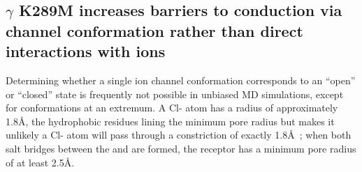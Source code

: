 \documentclass[9pt,twocolumn,twoside,lineno]{pnas-new}
\begin{document}
 
 
\subsection*{$\gamma$ K289M increases barriers to conduction via channel conformation rather than direct interactions with ions}  
 
Determining whether a single ion channel conformation corresponds to an ``open'' or ``closed'' state is frequently not possible in unbiased MD simulations, except for conformations at an extremum. A Cl- atom has a radius of approximately 1.8\AA, the hydrophobic residues lining the minimum pore radius but makes it unlikely a Cl- atom will pass through a constriction of exactly 1.8\AA\ ; when both salt bridges between the \fivering and \triad are formed, the \WT receptor has a minimum pore radius of at least 2.5\AA.
\end{document}
